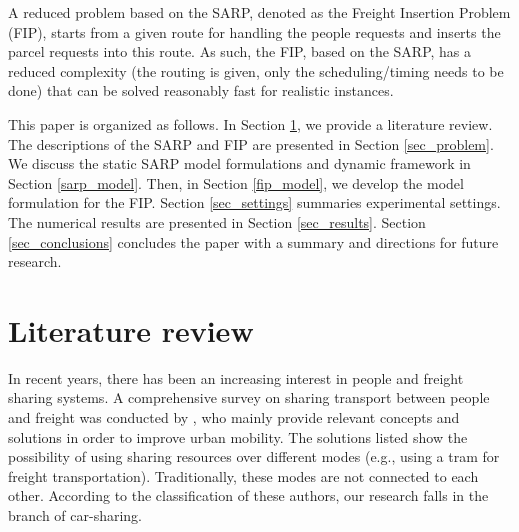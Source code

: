 \documentclass[preprint,authoryear,12pt]{elsarticle}
\begin{document}
A reduced problem based on the SARP, denoted as the Freight Insertion Problem (FIP), starts from a given route for handling the people requests and inserts the parcel requests into this route. As such, the FIP, based on the SARP, has a reduced complexity (the routing is given, only the scheduling/timing needs to be done) that can be solved reasonably fast for realistic instances.

This paper is organized as follows. In Section \ref{sec_review}, we provide a literature review. The descriptions of  the SARP and FIP are presented in Section \ref{sec_problem}. We discuss the static SARP model formulations and dynamic framework in Section \ref{sarp_model}. Then, in Section \ref{fip_model}, we develop the model formulation for the FIP. Section \ref{sec_settings} summaries experimental settings. The numerical results are presented in Section \ref{sec_results}. Section \ref{sec_conclusions} concludes the paper with a summary and directions for future research.










\section{Literature review}\label{sec_review}
In recent years, there has been an increasing interest in people and freight sharing systems. A comprehensive survey on sharing transport between people and freight was conducted by \cite{Trentini}, who mainly provide relevant concepts and solutions in order to improve urban mobility. The solutions listed show the possibility of using sharing resources over different modes (e.g., using a tram for freight transportation). Traditionally, these modes are not connected to each other. According to the classification of these authors, our research falls in the branch of car-sharing.
\end{document}
